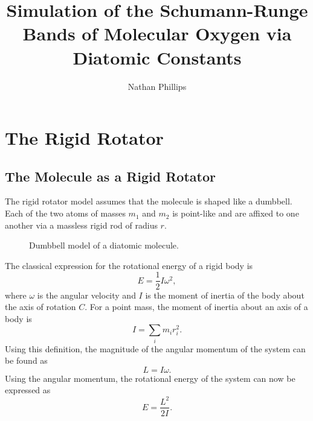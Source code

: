 \documentclass[11pt, twoside, fleqn]{report}
\title{Simulation of the Schumann-Runge Bands of Molecular Oxygen via Diatomic Constants}
\author{Nathan Phillips}
\begin{document}
\maketitle
\tableofcontents
\newpage
\listoffigures
\newpage
\listoftables
\newpage

\chapter{The Rigid Rotator}
\label{c:the_rigid_rotator}

\section{The Molecule as a Rigid Rotator}
\label{s:the_molecule_as_a_rigid_rotator}

The rigid rotator model assumes that the molecule is shaped like a dumbbell. Each of the two atoms of masses $m_1$ and $m_2$ is point-like and are affixed to one another via a massless rigid rod of radius $r$.

\begin{figure}[H]
    \centering
    \caption{Dumbbell model of a diatomic molecule.}
    \label{f:dumbbell_model}
\end{figure}

The classical expression for the rotational energy of a rigid body is
\begin{equation*}
    E = \frac{1}{2}I\omega^2,
\end{equation*}
where $\omega$ is the angular velocity and $I$ is the moment of inertia of the body about the axis of rotation $C$. For a point mass, the moment of inertia about an axis of a body is
\begin{equation*}
    I = \sum_i m_i r_i^2.
\end{equation*}
Using this definition, the magnitude of the angular momentum of the system can be found as
\begin{equation*}
    L = I\omega.
\end{equation*}
Using the angular momentum, the rotational energy of the system can now be expressed as
\begin{equation*}
    E = \frac{L^2}{2I}.
\end{equation*}
\end{document}
